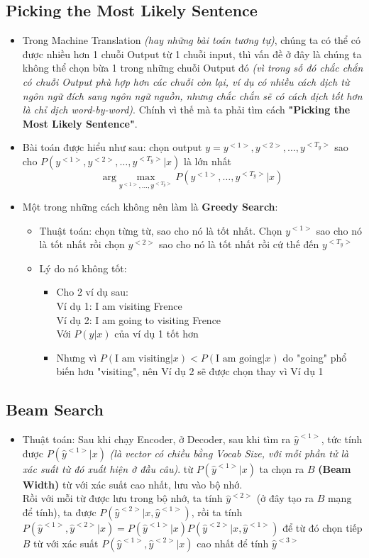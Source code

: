 \documentclass[12pt,a4paper]{report}
\begin{document}
	\subsection{Picking the Most Likely Sentence}
		\begin{itemize}
		\item Trong Machine Translation \textit{(hay những bài toán tương tự)}, chúng ta có thể có được nhiều hơn 1 chuỗi Output từ 1 chuỗi input, thì vấn đề ở đây là chúng ta không thể chọn bừa 1 trong những chuỗi Output đó \textit{(vì trong số đó chắc chắn có chuỗi Output phù hợp hơn các chuỗi còn lại, ví dụ có nhiều cách dịch từ ngôn ngữ đích sang ngôn ngữ nguồn, nhưng chắc chắn sẽ có cách dịch tốt hơn là chỉ dịch word-by-word)}. Chính vì thế mà ta phải tìm cách \textbf{"Picking the Most Likely Sentence"}.
		\item Bài toán được hiểu như sau: chọn output $y=y^{<1>},y^{<2>},\dots,y^{<T_y>}$ sao cho \break $P(y^{<1>},y^{<2>},\dots,y^{<T_y>}|x)$ là lớn nhất
			\[\text{arg} \max_{y^{<1>},\dots,y^{<T_y>}}P(y^{<1>},\dots,y^{<T_y>}|x)\]
		\item Một trong những cách không nên làm là \textbf{Greedy Search}:
			\begin{itemize}
			\item Thuật toán: chọn từng từ, sao cho nó là tốt nhất. Chọn $y^{<1>}$ sao cho nó là tốt nhất rồi chọn $y^{<2>}$ sao cho nó là tốt nhất rồi cứ thế đến $y^{<T_y>}$
			\item Lý do nó không tốt: 
				\begin{itemize}
				\item Cho 2 ví dụ sau:\\
				\tabto{0.5cm}Ví dụ 1: I am visiting Frence\\
				\tabto{0.5cm}Ví dụ 2: I am going to visiting Frence\\
				\tabto{0.5cm}Với $P(y|x)$ của ví dụ 1 tốt hơn
				\item Nhưng vì $P(\text{I am visiting}|x) < P(\text{I am going}|x)$ do "going" phổ biến hơn "visiting", nên Ví dụ 2 sẽ được chọn thay vì Ví dụ 1
				\end{itemize}
			\end{itemize}
		\end{itemize}
	\subsection{Beam Search}
		\begin{itemize}
		\item Thuật toán: Sau khi chạy Encoder, ở Decoder, sau khi tìm ra $\hat{y}^{<1>}$, tức tính được $P(\hat{y}^{<1>}|x)$ \textit{(là vector có chiều bằng Vocab Size, với mỗi phần tử là xác suất từ đó xuất hiện ở đầu câu)}. từ $P(\hat{y}^{<1>}|x)$ ta chọn ra $B$ \textbf{(Beam Width)} từ với xác suất cao nhất, lưu vào bộ nhớ.\\Rồi với mỗi từ được lưu trong bộ nhớ, ta tính $\hat{y}^{<2>}$ (ở đây tạo ra $B$ mạng để tính), ta được $P(\hat{y}^{<2>}|x,\hat{y}^{<1>})$, rồi ta tính $P(\hat{y}^{<1>},\hat{y}^{<2>}|x) = P(\hat{y}^{<1>}|x)P(\hat{y}^{<2>}|x,\hat{y}^{<1>})$ để từ đó chọn tiếp $B$ từ với xác suất $P(\hat{y}^{<1>},\hat{y}^{<2>}|x)$ cao nhất để tính $\hat{y}^{<3>}$
		\end{itemize}
\end{document}
